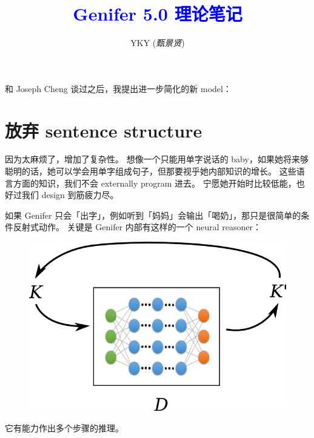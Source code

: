 \documentclass[12pt]{article}
\title{\textcolor{blue}{Genifer 5.0 理论笔记}}
\author{YKY (\textit{甄景贤})}
\newcommand{\tab}{\hspace*{1cm}}
\begin{document}

{\let\newpage\relax\maketitle}

\maketitle
\setlength{\parindent}{0em}
\setlength{\parskip}{1.5ex plus0.5ex minus1.2ex}

和 Joseph Cheng 谈过之后，我提出进一步简化的新 model：

\section{放弃 sentence structure}

因为太麻烦了，增加了复杂性。  想像一个只能用单字说话的 baby，如果她将来够聪明的话，她可以学会用单字组成句子，但那要视乎她内部知识的增长。 这些语言方面的知识，我们不会 externally program 进去。 宁愿她开始时比较低能，也好过我们 design 到筋疲力尽。

如果 Genifer 只会「出字」，例如听到「妈妈」会输出「喝奶」，那只是很简单的条件反射式动作。 关键是 Genifer 内部有这样的一个 neural reasoner：
\begin{figure}[H]
\centering
\includegraphics[scale=0.75]{reasoner-model.png}
\end{figure}
它有能力作出多个步骤的推理。
\end{document}
